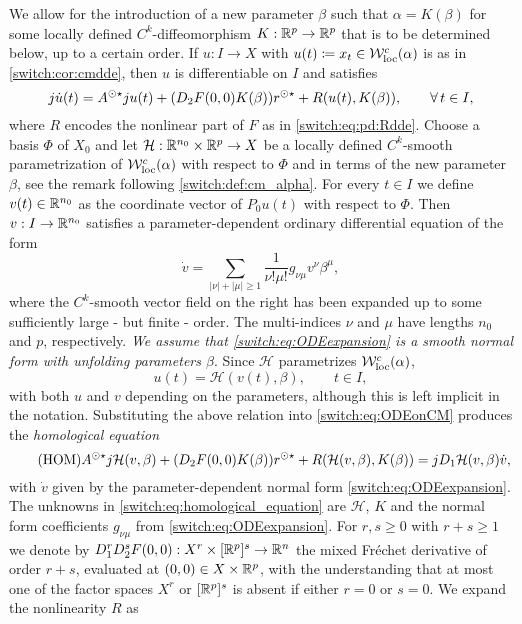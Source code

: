 \par
We allow for the introduction of a new parameter $\beta$ such that $\alpha = K(\beta)$ for some locally defined $C^k$-diffeomorphism $K : \mathbb{R}^p \to \mathbb{R}^p$ that is to be determined below, up to a certain order. If $u : I \to X$ with $u(t) \coloneqq x_t \in \mathcal{W}^c_{\text{loc}}(\alpha)$ is as in \cref{switch:cor:cmdde}, then $u$ is differentiable on $I$ and satisfies
\begin{equation}
  \label{switch:eq:ODEonCM}
  j\dot{u}(t) = A^{\odot\star}ju(t) + (D_2F(0,0)K(\beta))r^{\odot\star} + R(u(t),K(\beta)), \qquad \forall\,t \in I,
\end{equation}
where $R$ encodes the nonlinear part of $F$ as in \cref{switch:eq:pd:Rdde}. Choose a basis $\Phi$ of $X_0$ and let $\mathcal{H} : \mathbb{R}^{n_0} \times \mathbb{R}^p \to X$ be a locally defined $C^k$-smooth parametrization of $\mathcal{W}^c_{\text{loc}}(\alpha)$ with respect to $\Phi$ and in terms of the new parameter $\beta$, see the remark following \cref{switch:def:cm_alpha}. For every $t \in I$ we define $v(t) \in \mathbb{R}^{n_0}$ as the coordinate vector of $P_0 u(t)$ with respect to $\Phi$. Then $v : I \to \mathbb{R}^{n_0}$ satisfies a parameter-dependent ordinary differential equation of the form
\begin{equation}
  \label{switch:eq:ODEexpansion}
  \dot{v} = \sum_{|\nu|+|\mu| \geq 1}\frac{1}{\nu!\mu!}g_{\nu\mu}v^{\nu}\beta^{\mu},
\end{equation}
where the $C^k$-smooth vector field on the right has been expanded up to some sufficiently large - but finite - order. The multi-indices $\nu$ and $\mu$ have lengths $n_0$ and $p$, respectively. \emph{We assume that \cref{switch:eq:ODEexpansion} is a smooth normal form with unfolding parameters $\beta$}. Since $\mathcal{H}$ parametrizes $\mathcal{W}^c_{\text{loc}}(\alpha)$,
\[
  u(t) = \mathcal{H}(v(t), \beta), \qquad t \in I,
\]
with both $u$ and $v$ depending on the parameters, although this is left implicit in the notation. Substituting the above relation into \cref{switch:eq:ODEonCM} produces the \emph{homological equation}
\begin{equation}
  \label{switch:eq:homological_equation}
  \tag{HOM}
  A^{\odot\star}j\mathcal{H}(v,\beta)+(D_2F(0,0)K(\beta))r^{\odot\star} + R(\mathcal{H}(v,\beta),K(\beta)) = jD_1\mathcal{H}(v,\beta)\dot{v},
\end{equation}
with $\dot{v}$ given by the parameter-dependent normal form \cref{switch:eq:ODEexpansion}. The unknowns in \cref{switch:eq:homological_equation} are $\mathcal{H}$, $K$ and the normal form coefficients $g_{\nu\mu}$ from \cref{switch:eq:ODEexpansion}.  For $r, s \ge 0$ with $r + s \ge 1$ we denote by $D_1^rD_2^sF(0,0) : X^r \times [\mathbb{R}^p]^s \rightarrow \mathbb{R}^n$ the mixed Fr\'echet derivative of order $r + s$, evaluated at $(0,0) \in X \times \mathbb{R}^p$, with the understanding that at most one of the factor spaces $X^r$ or $[\mathbb{R}^p]^s$ is absent if either $r = 0$ or $s = 0$. We expand the nonlinearity $R$ as
